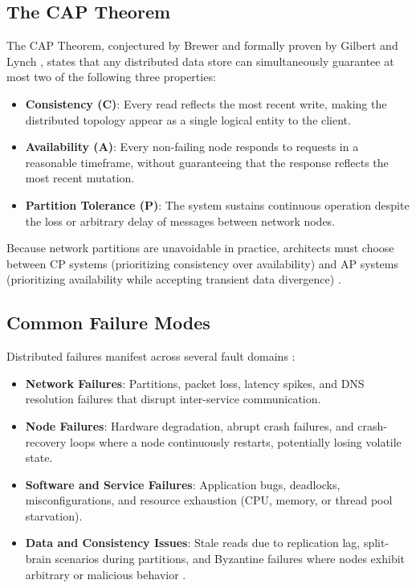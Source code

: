 \subsection{The CAP Theorem}
\label{subsec:bg_cap}

The CAP Theorem, conjectured by Brewer \cite{brewer2000towards} and formally proven by
Gilbert and Lynch \cite{gilbert2002brewer}, states that any distributed data store can
simultaneously guarantee at most two of the following three properties:

\begin{itemize}
    \item \textbf{Consistency (C)}: Every read reflects the most recent write, making
    the distributed topology appear as a single logical entity to the client.

    \item \textbf{Availability (A)}: Every non-failing node responds to requests in a
    reasonable timeframe, without guaranteeing that the response reflects the most
    recent mutation.

    \item \textbf{Partition Tolerance (P)}: The system sustains continuous operation
    despite the loss or arbitrary delay of messages between network nodes.
\end{itemize}

Because network partitions are unavoidable in practice, architects must choose between
CP systems (prioritizing consistency over availability) and AP systems (prioritizing
availability while accepting transient data divergence) \cite{gilbert2002brewer,
kleppmann2017designing}.

\subsection{Common Failure Modes}
\label{subsec:bg_failure_modes}

Distributed failures manifest across several fault domains \cite{coulouris2011distributed}:

\begin{itemize}
    \item \textbf{Network Failures}: Partitions, packet loss, latency spikes, and DNS
    resolution failures that disrupt inter-service communication.

    \item \textbf{Node Failures}: Hardware degradation, abrupt crash failures, and
    crash-recovery loops where a node continuously restarts, potentially losing
    volatile state.

    \item \textbf{Software and Service Failures}: Application bugs, deadlocks,
    misconfigurations, and resource exhaustion (CPU, memory, or thread pool starvation).

    \item \textbf{Data and Consistency Issues}: Stale reads due to replication lag,
    split-brain scenarios during partitions, and Byzantine failures where nodes exhibit
    arbitrary or malicious behavior \cite{kleppmann2017designing, raynal2018fault}.
\end{itemize}

